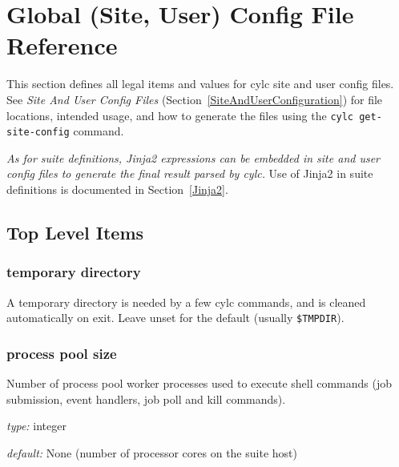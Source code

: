 
\section{Global (Site, User) Config File Reference}
\label{SiteRCReference}

\lstset{language=transcript}

This section defines all legal items and values for cylc site and
user config files. See {\em Site And User Config Files}
(Section~\ref{SiteAndUserConfiguration}) for file locations, intended
usage, and how to generate the files using the
\lstinline=cylc get-site-config= command.

{\em As for suite definitions, Jinja2 expressions can be embedded in
site and user config files to generate the final result parsed by cylc.}
Use of Jinja2 in suite definitions is documented in
Section~\ref{Jinja2}.

\subsection{Top Level Items}

\subsubsection{temporary directory}

A temporary directory is needed by a few cylc commands, and is cleaned
automatically on exit. Leave unset for the default (usually
\lstinline=$TMPDIR=).


\subsubsection{process pool size}

Number of process pool worker processes used to execute shell commands
(job submission, event handlers, job poll and kill commands).

\begin{myitemize}
\item {\em type:} integer
\item {\em default:} None (number of processor cores on the suite host)
\end{myitemize}

